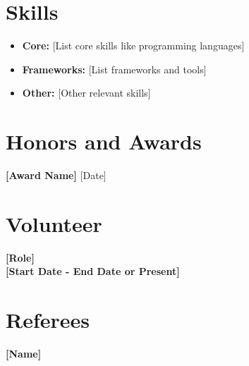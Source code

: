 \documentclass[10pt,letterpaper]{article}
\begin{document}
\section*{Skills}
\begin{itemize}[leftmargin=*,label={\color{darkgray}\textbullet}]
    \item \textbf{Core:} [List core skills like programming languages]
    \item \textbf{Frameworks:} [List frameworks and tools]
    \item \textbf{Other:} [Other relevant skills]
\end{itemize}

\section*{Honors and Awards}
\textbf{[Award Name]} \hfill [Date] \\
[Brief description if applicable.]

\section*{Volunteer}
\textbf{[Role]} \\
\textbf{[Start Date - End Date or Present]} \\
[Brief description of responsibilities or contributions.]

\section*{Referees}
\textbf{[Name]} \\
[Position, Organization] \\
[Contact Details]
\end{document}

